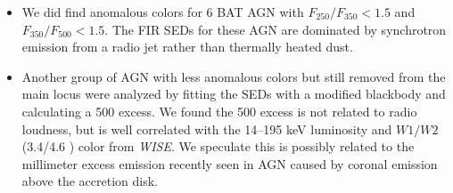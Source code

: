 \begin{itemize}
\item We did find anomalous colors for 6 BAT AGN with $F_{250}/F_{350} < 1.5$ and $F_{350}/F_{500} < 1.5$. The FIR SEDs for these AGN are dominated by synchrotron emission from a radio jet rather than thermally heated dust.

\item Another group of AGN with less anomalous colors but still removed from the main locus were analyzed by fitting the SEDs with a modified blackbody and calculating a 500 \um{} excess. We found the 500 \um{} excess is not related to radio loudness, but is well correlated with the 14--195 keV luminosity and $W1/W2$ (3.4/4.6 \um) color from \textit{WISE}. We speculate this is possibly related to the millimeter excess emission recently seen in AGN caused by coronal emission above the accretion disk.
\end{itemize}


  
  